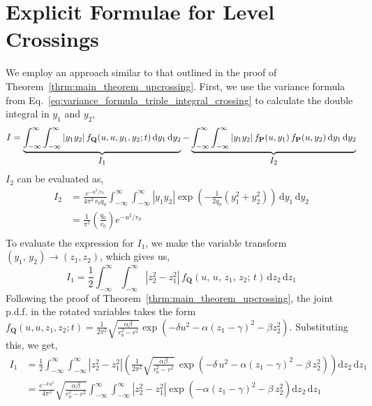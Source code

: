 \documentclass[journal]{IEEEtran}
\theoremstyle{plain}
\theoremstyle{definition}
\theoremstyle{remark}
\newcommand{\dd}{\mathrm{d}}
\begin{document}
\section{Explicit Formulae for Level Crossings}
\label{section:explicit_formulae_for_crossings}
We employ an approach similar to that outlined in the proof of Theorem~\ref{thrm:main_theorem_upcrossing}. First, we use the variance formula from Eq.~\eqref{eq:variance_formula_triple_integral_crossing} to calculate the double integral in $y_1$ and $y_2$,
\begin{equation}
    I = \underbrace{\int_{-\infty}^\infty \int_{-\infty}^\infty \left|y_1 y_2 \right| f_{\mathbf{Q}}(u, u, y_1, y_2;  t) \, \dd y_1 \, \dd y_2}_{\text{\normalsize \(I_1\)}} - \underbrace{\int_{-\infty}^\infty \int_{-\infty}^\infty \left|y_1 y_2 \right| f_{\mathbf{P}}(u,y_1) \, f_{\mathbf{P}}(u,y_2) \, \dd y_1 \, \dd y_2}_{\text{\normalsize \(I_2\)}} \label{eq:defn_of_I_split_crossing}
\end{equation}
$I_2$ can be evaluated as,
\begin{equation}
\begin{split}
    I_2 &= \frac{e^{-u^2/r_0}}{4\pi^2 \, r_0 q_0}\int_{-\infty}^\infty \int_{-\infty}^\infty \left|y_1 y_2 \right| \exp\left(-\frac{1}{2q_0}\left(y_1^2 + y_2^2\right)\right) \, \dd y_1 \, \dd y_2 \\
    &= \frac{1}{\pi^2 }\left(\frac{q_0}{r_0}\right)e^{-u^2/r_0} \\
\end{split} \label{eq:final_expr_for_I2_crossing}
\end{equation}
To evaluate the expression for $I_1$, we make the variable transform $(y_1, \, y_2)\rightarrow (z_1, z_2)$, which gives us,
\begin{equation}
    I_1 = \frac{1}{2}\int_{-\infty}^\infty \int_{-\infty}^\infty \left|z_2^2 - z_1^2\right| \, f_{\mathbf{Q}}(u, \,u, \,z_1, \,z_2; \, t) \, \dd z_2 \, \dd z_1 \label{eq:I1_defn_z1_z2_crossing}
\end{equation}
Following the proof of Theorem~\ref{thrm:main_theorem_upcrossing}, the joint p.d.f. in the rotated variables takes the form $f_{\mathbf{Q}}(u, u, z_1, z_2; t) = \frac{1}{2\pi^2}\sqrt{\frac{\alpha\beta}{r_0^2-r^2}} \exp\left( -\delta u^2 - \alpha (z_1 - \gamma)^2 - \beta z_2^2\right)$. Substituting this, we get,
\begin{equation}
\begin{split}
    I_1 &= \frac{1}{2}\int_{-\infty}^\infty \int_{-\infty}^\infty \left|z_2^2 - z_1^2\right| \left(\frac{1}{2\pi^2}\sqrt{\frac{\alpha\beta}{r_0^2-r^2}} \,\exp\left( -\delta \, u^2 - \alpha \left(z_1 - \gamma \right)^2 - \beta \, z_2^2\right)\right) \dd z_2 \, \dd z_1 \\
    &= \frac{e^{-\delta\,u^2}}{4\pi^2}\sqrt{\frac{\alpha\beta}{r_0^2-r^2}}\int_{-\infty}^\infty \int_{-\infty}^\infty \left|z_2^2 - z_1^2\right| \exp\left(- \alpha \left(z_1 - \gamma \right)^2 - \beta \, z_2^2\right) \dd z_2 \, \dd z_1
\end{split}
\end{equation}
\end{document}
